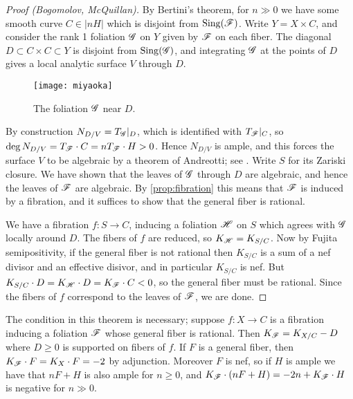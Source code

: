 \begin{proof}[Proof (Bogomolov, McQuillan)]
    By Bertini's theorem, for $n\gg0$ we have some smooth curve $C\in|nH|$ which
    is disjoint from $\operatorname{Sing}(\mathscr{F})$. Write $Y=X\times C$, and consider the rank
    1 foliation $\mathscr{G}$ on $Y$ given by $\mathscr{F}$ on each fiber. The diagonal
    $D\subset C\times C\subset Y$ is disjoint from $\operatorname{Sing}(\mathscr{G})$, and
    integrating $\mathscr{G}$ at the points of $D$ gives a local analytic surface $V$
    through $D$.
    \begin{figure}[H]
        \centering
        \texttt{[image: miyaoka]} %
        \caption{The foliation $\mathscr{G}$ near $D$.}
    \end{figure}
    By construction $N_{D/V}=T_{\mathscr{G}}|_D$, which is identified with $T_{\mathscr{F}}|_C$,
    so $\deg N_{D/V}=T_{\mathscr{F}}\cdot C=nT_{\mathscr{F}}\cdot H>0$. Hence $N_{D/V}$ is
    ample, and this forces the surface $V$ to be algebraic by a theorem of
    Andreotti; see \cite[Thm 3.4]{bost_13}. Write $S$ for its Zariski closure.
    We have shown that the leaves of $\mathscr{G}$ through $D$ are algebraic, and
    hence the leaves of $\mathscr{F}$ are algebraic. By \cref{prop:fibration} this
    means that $\mathscr{F}$ is induced by a fibration, and it suffices to show that
    the general fiber is rational.

    We have a fibration $f:S\to C$, inducing a foliation $\mathscr{H}$ on $S$ which
    agrees with $\mathscr{G}$ locally around $D$. The fibers of $f$ are reduced, so
    $K_{\mathscr{H}}=K_{S/C}$. Now by Fujita semipositivity, if the general fiber is not
    rational then $K_{S/C}$ is a sum of a nef divisor and an effective disivor,
    and in particular $K_{S/C}$ is nef. But
    $K_{S/C}\cdot D=K_{\mathscr{H}}\cdot D=K_{\mathscr{F}}\cdot C<0$, so the general fiber must
    be rational. Since the fibers of $f$ correspond to the leaves of $\mathscr{F}$, we
    are done.
\end{proof}

\begin{remark}
    The condition in this theorem is necessary; suppose $f:X\to C$ is a
    fibration inducing a foliation $\mathscr{F}$ whose general fiber is rational. Then
    $K_{\mathscr{F}}=K_{X/C}-D$ where $D\ge0$ is supported on fibers of $f$. If $F$ is a
    general fiber, then $K_{\mathscr{F}}\cdot F=K_X\cdot F=-2$ by adjunction. Moreover
    $F$ is nef, so if $H$ is ample we have that $nF+H$ is also ample for
    $n\ge0$, and $K_{\mathscr{F}}\cdot(nF+H)=-2n+K_{\mathscr{F}}\cdot H$ is negative for
    $n\gg0$.
\end{remark}
